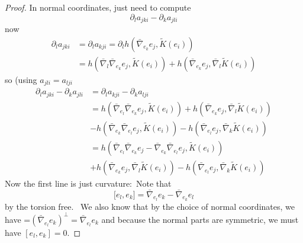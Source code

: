 \documentclass[12pt,letterpaper]{amsart}%
\numberwithin{mycounter}{section}
\theoremstyle{plain}
\numberwithin{equation}{section}
\theoremstyle{definition}
\begin{document}
\begin{proof}
In normal coordinates, just need to compute
\[
\partial_{l}a_{jki}-\partial_{k}a_{jli}%
\]
now
\begin{align*}
\partial_{l}a_{jki}  &  =\partial_{l}a_{kji}=\partial_{l}h(\bar{\nabla}%
_{e_{k}}e_{j},\tilde{K}(e_{i}))\\
&  =h(\bar{\nabla}_{l}\bar{\nabla}_{e_{k}}e_{j},\tilde{K}(e_{i}))+h(\bar
{\nabla}_{e_{k}}e_{j},\bar{\nabla}_{l}\tilde{K}(e_{i}))
\end{align*}
so (using $a_{jli}=a_{lji}$
\begin{align*}
\partial_{l}a_{jki}-\partial_{k}a_{jli}  &  =\partial_{l}a_{kji}-\partial
_{k}a_{lji}\\
&  =h(\bar{\nabla}_{e_{l}}\bar{\nabla}_{e_{k}}e_{j},\tilde{K}(e_{i}%
))+h(\bar{\nabla}_{e_{k}}e_{j},\bar{\nabla}_{l}\tilde{K}(e_{i}))\\
&  -h(\bar{\nabla}_{e_{k}}\bar{\nabla}_{e_{l}}e_{j},\tilde{K}(e_{i}%
))-h(\bar{\nabla}_{e_{l}}e_{j},\bar{\nabla}_{k}\tilde{K}(e_{i}))\\
&  =h(\bar{\nabla}_{e_{l}}\bar{\nabla}_{e_{k}}e_{j}-\bar{\nabla}_{e_{k}}%
\bar{\nabla}_{e_{l}}e_{j},\tilde{K}(e_{i}))\\
&  +h(\bar{\nabla}_{e_{k}}e_{j},\bar{\nabla}_{l}\tilde{K}(e_{i}))-h(\bar
{\nabla}_{e_{l}}e_{j},\bar{\nabla}_{k}\tilde{K}(e_{i}))
\end{align*}
Now the first line is just curvature:\ Note that
\[
\lbrack e_{l},e_{k}]=\bar{\nabla}_{e_{l}}e_{k}-\bar{\nabla}_{e_{k}}e_{l}%
\]
by the torsion free. \ We also know that by the choice of normal coordinates,
we have =$\left(  \bar{\nabla}_{e_{l}}e_{k}\right)  ^{\perp}=\bar{\nabla
}_{e_{l}}e_{k}$ and because the normal parts are symmetric, we must have
$[e_{l},e_{k}]=0.$


\end{proof}
\end{document}
